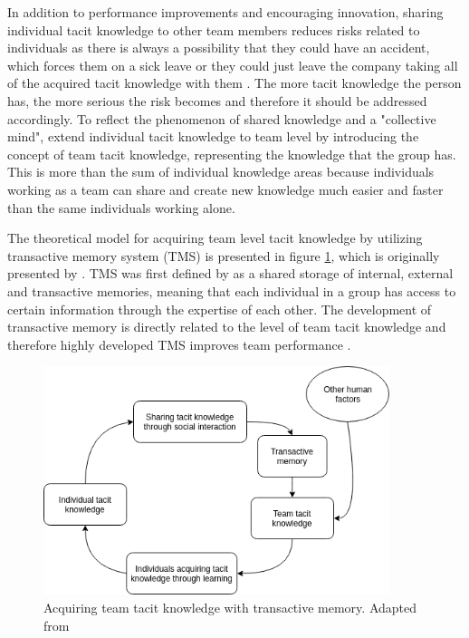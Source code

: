 In addition to performance improvements and encouraging innovation, sharing individual tacit knowledge to other team members reduces risks related to individuals
as there is always a possibility that they could have an accident, which forces them on a sick leave or they could just leave the company taking all of the acquired
tacit knowledge with them \citep{Ersoy2015}. The more tacit knowledge the person has, the more serious the risk becomes and therefore it should be addressed
accordingly. To reflect the phenomenon of shared knowledge and a "collective mind", \citet{Ryan2009} extend individual tacit knowledge to team level by introducing the concept of
team tacit knowledge, representing the knowledge that the group has. This is more than the sum of individual knowledge areas because individuals working as a team
can share and create new knowledge much easier and faster than the same individuals working alone.

The theoretical model for acquiring team level tacit knowledge by utilizing transactive memory system (TMS) is presented in figure \ref{fig:team-tacit},
which is originally presented by \citet{Ryan2013}. TMS was first defined by \citet{Wegner1987} as a shared storage of internal, external and transactive memories,
meaning that each individual in a group has access to certain information through the expertise of each other. The development of transactive memory is directly
related to the level of team tacit knowledge and therefore highly developed TMS improves team performance \citep{Ryan2013}.

\begin{figure}[ht]
  \begin{center}
    \includegraphics[width=0.9\textwidth]{images/Team-tacit-knowledge.png}
    \caption{Acquiring team tacit knowledge with transactive memory. Adapted from \citet[p.~8]{Ryan2013}}
    \label{fig:team-tacit}
  \end{center}
\end{figure}


